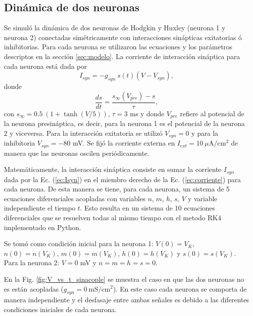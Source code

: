 \documentclass[11pt,twocolumn,twoside]{opticajnl}
\begin{document}
\subsection{Dinámica de dos neuronas}

\vspace{0.3cm}

Se simuló la dinámica de dos neuronas de Hodgkin y Huxley (neurona 1 y neurona 2) conectadas simétricamente con interacciones sinápticas exitatorias ó inhibitorias. Para cada neurona se utilizaron las ecuaciones y los parámetros descriptos en la sección \ref{sec:modelo}. La corriente de interacción sináptica para cada neurona está dada por 
\begin{equation}
    I_{syn} = -g_{syn}~ s(t) (V-V_{syn}),
    \label{ec:Isyn}
\end{equation}
donde
\begin{equation}
    \frac{ds}{dt} = \frac{s_{\infty}(V_{pre}) - s}{\tau},
\end{equation}
con $s_{\infty} = 0.5 ~(1 + \tanh(V/5))$, $\tau = 3$ ms y donde $V_{pre}$ refiere al potencial de la neurona presináptica, es decir, para la neurona 1 es el potencial de la neurona 2 y viceversa. Para la interacción exitatoria se utilizó $V_{syn}= 0$ y para la inhibitoria $V_{syn} = -80$ mV. Se fijó la corriente externa en $I_{ext} = 10 ~\mu\text{A}/\text{cm}^2$ de manera que las neuronas oscilen periódicamente. 

Matemáticamente, la interacción sináptica consiste en sumar la corriente $I_{syn}$ dada por la Ec. (\ref{ec:Isyn}) en el miembro derecho de la Ec. (\ref{ec:corriente}) para cada neurona. De esta manera se tiene, para cada neurona, un sistema de 5 ecuaciones diferenciales acopladas con variables $n$, $m$, $h$, $s$, $V$ y variable independiente el tiempo $t$. Esto resulta en un sistema de 10 ecuaciones diferenciales que se resuelven todas al mismo tiempo con el metodo RK4 implementado en Python. 

Se tomó como condición inicial para la neurona 1: $V(0) = V_K$, $n(0) = n(V_K)$, $m(0) = m(V_K)$, $h(0) = h(V_K)$ y $s(0) = s(V_K)$. Para la neurona 2: $V=0$ mV y $n=m=h=s=0$.

\newpage

En la Fig. \ref{fig:V_vs_t_sinacople} se muestra el caso en que las dos neuronas no es están acopladas ($g_{syn} = 0 ~\text{mS}/\text{cm}^2$). En este caso cada neurona se comporta de manera independiente y el desfasaje entre ambas señales es debido a las diferentes condiciones iniciales de cada neurona.
\end{document}
